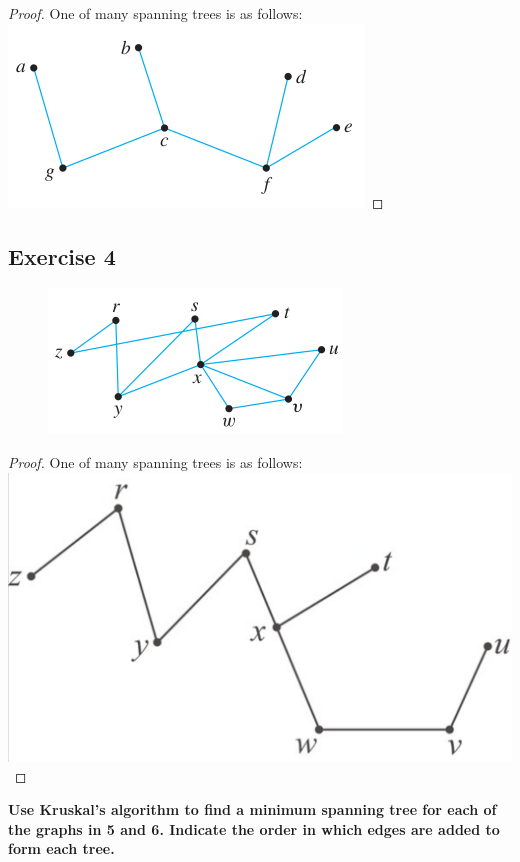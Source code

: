 \documentclass[14pt]{extarticle}
\newcommand{\cy}{\color{cyan}}
\begin{document}
\begin{proof}
    One of many spanning trees is as follows:
    \includegraphics[scale=0.5]{../images/10.6.3.2.png}
\end{proof}

\subsection{Exercise 4}
\begin{figure}[ht!]
    \centering
    \includegraphics[scale=0.5]{../images/10.6.4.png}
\end{figure}

\begin{proof}
    One of many spanning trees is as follows:
    \includegraphics[scale=0.2]{../images/10.6.4.2.png}
\end{proof}

{\bf \cy Use Kruskal’s algorithm to find a minimum spanning tree for each of the graphs in 5 and 6. Indicate the order in
which edges are added to form each tree.}
\end{document}
